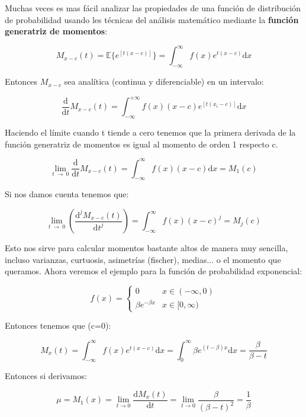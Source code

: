 \documentclass[12pt,a4paper]{book}
\newcommand{\D}{\mathrm{d}}
\newcommand{\E}{\mathbb{E}}
\newcommand{\integral}{\int_{-\infty}^{\infty}}
\begin{document}
Muchas veces es mas fácil analizar las propiedades de una función de distribución de probabilidad usando les técnicas del análisis matemático mediante la \textbf{función generatriz de momentos}:

\begin{equation}
M_{x-c} (t) = \E \{ e^{[t(x-c)]} \} = \integral f(x) e^{t(x-c)} \D  x
\end{equation}

Entonces $M_{x-c}$ sea analítica (continua y diferenciable) en un intervalo:  

\begin{equation}
\dfrac{\D }{\D t} M_{x-c} (t) = \int_{-\infty}^{+\infty} f(x) (x-c) e^{[t(x_i-c)]} \D x
\end{equation}

Haciendo el límite cuando t tiende a cero tenemos que la primera derivada de la función generatriz de momentos es igual al momento de orden 1 respecto c.

\begin{equation}
\lim_{t \ \rightarrow \ 0} \dfrac{\D }{\D t} M_{x-c} (t) = \integral f(x) (x-c) \D x =  M_1(c)
\end{equation}

Si nos damos cuenta tenemos que: 

\begin{equation}
\lim_{t \ \rightarrow \ 0} (\dfrac{\D^j M_{x-c} (t)}{\D t^j}) = \integral f(x) (x-c)^j =M_j (c)
\end{equation}

Esto nos sirve para calcular momentos bastante altos de manera muy sencilla, incluso varianzas, curtuosis, asimetrías (fischer), medias... o el momento que queramos. Ahora veremos el ejemplo para la función de probabilidad exponencial:

\begin{displaymath}
f(x) = \left\lbrace 
\begin{array}{ll}
0 & x \in (-\infty,0) \\
\beta e^{-\beta x} & x \in[0,\infty)
\end{array} \right.
\end{displaymath}

Entonces tenemos que (c=0):

$$ M_x(t) = \integral f(x)  e^{t(x-c)} \D x = \int_0^{\infty} \beta e^{(t-\beta)x} \D x = \dfrac{\beta}{\beta - t} $$

Entonces si derivamos:

$$ \mu = M_1(x) = \lim_{t \rightarrow 0} \dfrac{\D M_x(t)}{\D t} = \lim_{t \rightarrow 0} \dfrac{\beta}{(\beta-t)^2} = \dfrac{1}{\beta} $$
\end{document}
